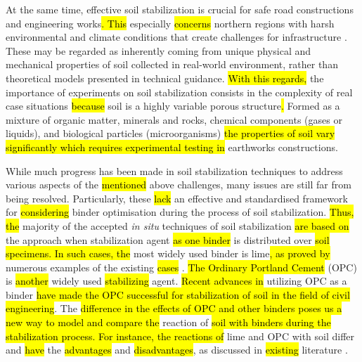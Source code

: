 \documentclass[eprint,
]{actapoly}
\begin{document}
At the same time,\hl{ }effective soil stabilization is crucial for safe road constructions and engineering works\hl{. This }especially \hl{concerns }northern regions with harsh environmental and climate conditions that create challenges for\hl{ }infrastructure \citep{Dahlinetal1999,ROTHHAMEL2022100735,Lindh2004,VESTIN2018146,Lemenkov2021a,Lemenkov2021b,Eigenbrod}. These\hl{ }may be regarded as inherently coming from unique physical and mechanical properties of soil collected in real-world environment, rather than theoretical models presented in technical guidance. \hl{With this regards, }the importance of experiments on soil stabilization consists in the complexity of real case situations\hl{ because }soil is a highly variable porous structure\hl{. }Formed as a mixture of organic matter, minerals and rocks, chemical components (gases or liquids), and biological particles (microorganisms) \hl{the properties of soil vary significantly which requires experimental testing in} earthworks constructions. 

While much progress has been made in soil stabilization techniques to address various aspects of the \hl{mentioned }above challenges, many issues are still far from being resolved. Particularly, these\hl{ lack }an effective and standardised framework for \hl{considering }binder optimisation during the process of soil stabilization.\hl{ Thus, the }majority of the accepted \emph{in situ} techniques of soil stabilization \hl{are based on }the approach when stabilization agent \hl{as one binder }is distributed over\hl{ soil specimens. In such cases, the }most widely used binder is lime\hl{, as proved by }numerous examples of the existing \hl{cases} \citep{Greaves,RaoThyagaraj,Rogersetal2000,ATTOHOKINE1995283,ROBIN2014211,Harichane,GlendinningRogers}. \hl{The Ordinary Portland Cement }(OPC) is \hl{another }widely used \hl{stabilizing }agent. \hl{Recent advances in }utilizing OPC as a binder\hl{ }\citep{Prusinski,Bhattacharjaetal2003,Lindh202201,Lindh202102,KULKARNI2022125363}\hl{ have made the OPC successful for stabilization of soil in the field of civil engineering}. The \hl{difference in the effects of OPC and other binders poses us a new way to model and compare the }reaction of \hl{soil with binders during the stabilization process. For instance, the reactions of }lime and OPC with soil\hl{ }differ\hl{ }and \hl{have }the \hl{advantages} and \hl{disadvantages}, as discussed in \hl{existing} literature \citep{Mahedi,KOLIAS2005301,BARMAN20221319,Lindhetal2000,Chewetal2004,KOOHMISHI2022100726}. 
\end{document}
